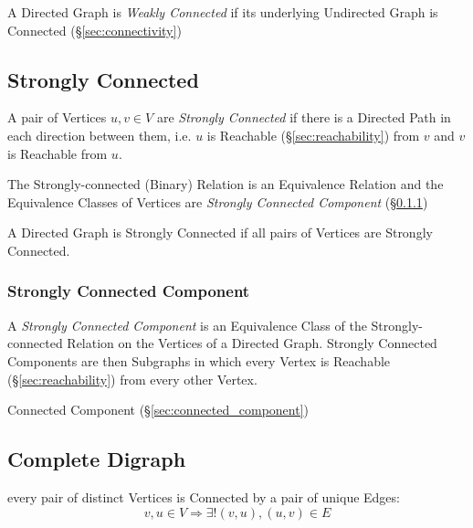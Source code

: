 A Directed Graph is \emph{Weakly Connected} if its underlying
Undirected Graph is Connected (\S\ref{sec:connectivity})



\subsection{Strongly Connected}\label{sec:strongly_connected}

A pair of Vertices $u,v \in V$ are \emph{Strongly Connected} if there
is a Directed Path in each direction between them, i.e. $u$ is
Reachable (\S\ref{sec:reachability}) from $v$ and $v$ is Reachable
from $u$.

The Strongly-connected (Binary) Relation is an Equivalence Relation
and the Equivalence Classes of Vertices are \emph{Strongly Connected
  Component} (\S\ref{sec:strongly_connected_component})

A Directed Graph is Strongly Connected if all pairs of Vertices are
Strongly Connected.



\subsubsection{Strongly Connected Component}
\label{sec:strongly_connected_component}

A \emph{Strongly Connected Component} is an Equivalence Class of the
Strongly-connected Relation on the Vertices of a Directed Graph.
Strongly Connected Components are then Subgraphs in which every Vertex
is Reachable (\S\ref{sec:reachability}) from every other Vertex.

Connected Component (\S\ref{sec:connected_component})



\subsection{Complete Digraph}\label{sec:complete_digraph}

every pair of distinct Vertices is Connected by a pair of unique
Edges:
\[
  v,u \in V \Rightarrow \exists! (v,u), (u,v) \in E
\]



